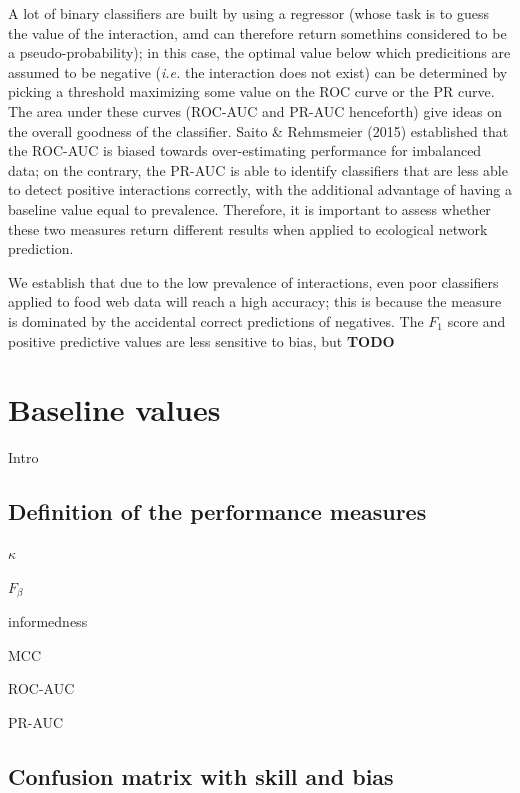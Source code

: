 \documentclass[11pt]{article}
\begin{document}
A lot of binary classifiers are built by using a regressor (whose task
is to guess the value of the interaction, amd can therefore return
somethins considered to be a pseudo-probability); in this case, the
optimal value below which predicitions are assumed to be negative
(\emph{i.e.} the interaction does not exist) can be determined by
picking a threshold maximizing some value on the ROC curve or the PR
curve. The area under these curves (ROC-AUC and PR-AUC henceforth) give
ideas on the overall goodness of the classifier. Saito \& Rehmsmeier
(2015) established that the ROC-AUC is biased towards over-estimating
performance for imbalanced data; on the contrary, the PR-AUC is able to
identify classifiers that are less able to detect positive interactions
correctly, with the additional advantage of having a baseline value
equal to prevalence. Therefore, it is important to assess whether these
two measures return different results when applied to ecological network
prediction.

We establish that due to the low prevalence of interactions, even poor
classifiers applied to food web data will reach a high accuracy; this is
because the measure is dominated by the accidental correct predictions
of negatives. The \(F_1\) score and positive predictive values are less
sensitive to bias, but \textbf{TODO}

\hypertarget{baseline-values}{%
\section{Baseline values}\label{baseline-values}}

Intro

\hypertarget{definition-of-the-performance-measures}{%
\subsection{Definition of the performance
measures}\label{definition-of-the-performance-measures}}

\(\kappa\)

\(F_{\beta}\)

informedness

MCC

ROC-AUC

PR-AUC

\hypertarget{confusion-matrix-with-skill-and-bias}{%
\subsection{Confusion matrix with skill and
bias}\label{confusion-matrix-with-skill-and-bias}}
\end{document}
